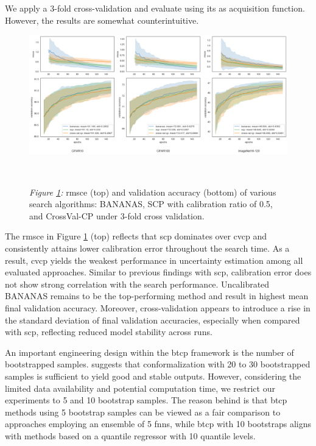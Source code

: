 \documentclass[a4paper,oneside,bibliography=totoc]{scrbook}
\begin{document}
\begin{description}[leftmargin=0cm, listparindent=\parindent]
 	\item[Performance for CrossVal-CP:] We apply a 3-fold cross-validation and evaluate using \gls{its} as acquisition function. However, the results are somewhat counterintuitive. 

	\vspace{0.3em}
	\begin{figure}[H]
		\centering
		\includegraphics[scale=0.37 ]{figs/cvcp.png}
		\label{fig: cvcp}
		\\
 		\parbox{\linewidth}{
		\vspace{1em}
 	  		{\small \textit{Figure \ref{fig: cvcp}:} \gls{rmsce} (top) and validation accuracy (bottom) of various search algorithms: BANANAS, SCP with calibration ratio of 0.5, and CrossVal-CP under 3-fold cross validation.}
 	 	}	
	\end{figure}
	
	The \gls{rmsce} in Figure \ref{fig: cvcp} (top) reflects that \gls{scp} dominates over \gls{cvcp} and consistently attains lower calibration error throughout the search time. As a result, \gls{cvcp} yields the weakest performance in uncertainty estimation among all evaluated approaches. Similar to previous findings with \gls{scp}, calibration error does not show strong correlation with the search performance. Uncalibrated BANANAS remains to be the top-performing method and result in highest mean final validation accuracy. Moreover, cross-validation appears to introduce a rise in the standard deviation of final validation accuracies, especially when compared with \gls{scp}, reflecting reduced model stability across runs. 
	
	\item[Performance for Bootstrap-CP:] An important engineering design within the \gls{btcp} framework is the number of bootstrapped samples. \cite{pmlr-v139-xu21h} suggests that conformalization with 20 to 30 bootstrapped samples is sufficient to yield good and stable outputs. However, considering the limited data availability and potential computation time, we restrict our experiments to 5 and 10 bootstrap samples. The reason behind is that \gls{btcp} methods using 5 bootstrap samples can be viewed as a fair comparison to approaches employing an ensemble of 5 \gls{fnns}, while \gls{btcp} with 10 bootstraps aligns with methods based on a quantile regressor with 10 quantile levels. 
	

\end{description}
\end{document}

